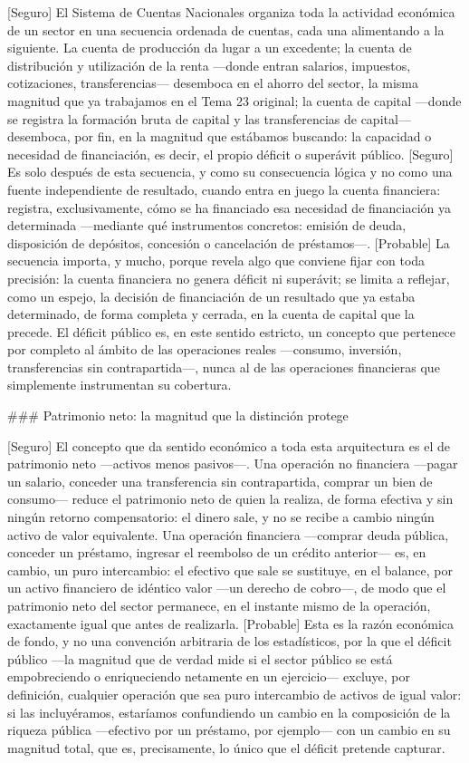 \documentclass[10pt,a4paper]{article}
\begin{document}
[Seguro] El Sistema de Cuentas Nacionales organiza toda la actividad económica de un sector en una secuencia ordenada de cuentas, cada una alimentando a la siguiente. La cuenta de producción da lugar a un excedente; la cuenta de distribución y utilización de la renta —donde entran salarios, impuestos, cotizaciones, transferencias— desemboca en el ahorro del sector, la misma magnitud que ya trabajamos en el Tema 23 original; la cuenta de capital —donde se registra la formación bruta de capital y las transferencias de capital— desemboca, por fin, en la magnitud que estábamos buscando: la capacidad o necesidad de financiación, es decir, el propio déficit o superávit público. [Seguro] Es solo después de esta secuencia, y como su consecuencia lógica y no como una fuente independiente de resultado, cuando entra en juego la cuenta financiera: registra, exclusivamente, cómo se ha financiado esa necesidad de financiación ya determinada —mediante qué instrumentos concretos: emisión de deuda, disposición de depósitos, concesión o cancelación de préstamos—. [Probable] La secuencia importa, y mucho, porque revela algo que conviene fijar con toda precisión: la cuenta financiera no genera déficit ni superávit; se limita a reflejar, como un espejo, la decisión de financiación de un resultado que ya estaba determinado, de forma completa y cerrada, en la cuenta de capital que la precede. El déficit público es, en este sentido estricto, un concepto que pertenece por completo al ámbito de las operaciones reales —consumo, inversión, transferencias sin contrapartida—, nunca al de las operaciones financieras que simplemente instrumentan su cobertura.

### Patrimonio neto: la magnitud que la distinción protege

[Seguro] El concepto que da sentido económico a toda esta arquitectura es el de patrimonio neto —activos menos pasivos—. Una operación no financiera —pagar un salario, conceder una transferencia sin contrapartida, comprar un bien de consumo— reduce el patrimonio neto de quien la realiza, de forma efectiva y sin ningún retorno compensatorio: el dinero sale, y no se recibe a cambio ningún activo de valor equivalente. Una operación financiera —comprar deuda pública, conceder un préstamo, ingresar el reembolso de un crédito anterior— es, en cambio, un puro intercambio: el efectivo que sale se sustituye, en el balance, por un activo financiero de idéntico valor —un derecho de cobro—, de modo que el patrimonio neto del sector permanece, en el instante mismo de la operación, exactamente igual que antes de realizarla. [Probable] Esta es la razón económica de fondo, y no una convención arbitraria de los estadísticos, por la que el déficit público —la magnitud que de verdad mide si el sector público se está empobreciendo o enriqueciendo netamente en un ejercicio— excluye, por definición, cualquier operación que sea puro intercambio de activos de igual valor: si las incluyéramos, estaríamos confundiendo un cambio en la composición de la riqueza pública —efectivo por un préstamo, por ejemplo— con un cambio en su magnitud total, que es, precisamente, lo único que el déficit pretende capturar.
\end{document}
